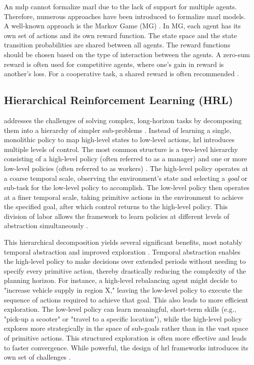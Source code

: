 An \gls{mdp} cannot formalize \gls{marl} due to the lack of support for multiple agents.
Therefore, numerous approaches have been introduced to formalize \gls{marl} models.
A well-known approach is the Markov Game (MG) \cite{busoniu_multi-agent_2008}. 
In MG, each agent has its own set of actions and its own reward function.
The state space and the state transition probabilities are shared between all agents.
The reward functions should be chosen based on the type of interaction between the agents.
A zero-sum reward is often used for competitive agents, where one's gain in reward is another's loss.
For a cooperative task, a shared reward is often recommended \cite{busoniu_multi-agent_2008}.


\subsection{Hierarchical Reinforcement Learning (HRL)}
 addresses the challenges of solving complex, long-horizon tasks by decomposing them into a hierarchy of simpler sub-problems \cite{pateria_hierarchical_2021}.
Instead of learning a single, monolithic policy to map high-level states to low-level actions, \gls{hrl} introduces multiple levels of control.
The most common structure is a two-level hierarchy consisting of a high-level policy (often referred to as a manager) and one or more low-level policies (often referred to as workers) \cite{pateria_hierarchical_2021}.
The high-level policy operates at a coarse temporal scale, observing the environment's state and selecting a \textit{goal} or sub-task for the low-level policy to accomplish.
The low-level policy then operates at a finer temporal scale, taking primitive actions in the environment to achieve the specified goal, after which control returns to the high-level policy.
This division of labor allows the framework to learn policies at different levels of abstraction simultaneously \cite{pateria_hierarchical_2021}.

This hierarchical decomposition yields several significant benefits, most notably temporal abstraction and improved exploration \cite{pateria_hierarchical_2021}.
Temporal abstraction enables the high-level policy to make decisions over extended periods without needing to specify every primitive action, thereby drastically reducing the complexity of the planning horizon.
For instance, a high-level rebalancing agent might decide to "increase vehicle supply in region X," leaving the low-level policy to execute the sequence of actions required to achieve that goal.
This also leads to more efficient exploration.
The low-level policy can learn meaningful, short-term skills (e.g., "pick-up a scooter" or "travel to a specific location"), while the high-level policy explores more strategically in the space of sub-goals rather than in the vast space of primitive actions.
This structured exploration is often more effective and leads to faster convergence.
While powerful, the design of \gls{hrl} frameworks introduces its own set of challenges \cite{pateria_hierarchical_2021}.

